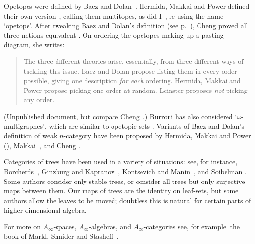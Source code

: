 \begin{notes}

Opetopes were defined by Baez and Dolan~\cite{BDHDA3}.  Hermida, Makkai and
Power defined their own version~\cite{HMP1, HMP2, HMP3, HMPHDM}, calling
them multitopes, as did I~\cite[4.1]{GOM}, re-using the name `opetope'.
After tweaking Baez and Dolan's definition (see p.~\pageref{p:BD-tweak}),
Cheng%
%
%
proved all three notions equivalent \cite{CheWOM, CheWCO}.  On
ordering%
%
%
%
%
the opetopes making up a pasting diagram, she writes:
%
\begin{quote}
  The three different theories arise, essentially, from three different
  ways of tackling this issue.  Baez and Dolan propose listing them in
  every order possible, giving one description \emph{for each} ordering.
  Hermida, Makkai and Power propose picking one order at random.  Leinster
  proposes \emph{not} picking any order.
\end{quote}
%
(Unpublished document, but compare Cheng~\cite[1.3]{CheWOM}.)  Burroni%
%
%
has
also considered `$\omega$-multigraphes', which are similar to opetopic sets
\cite{BurHDW, BurHDWA}.  Variants of Baez and Dolan's definition of weak
$n$-category have been proposed by Hermida, Makkai and Power (), Makkai~\cite{MakMOC},%
%
%
and Cheng \cite{CheWOM, CheCOCOS, CheACU}.

Categories of trees have been used in a variety of situations: see, for
instance, Borcherds~\cite{Borch},%
%
%
Ginzburg%
%
%
and Kapranov~\cite{GiKa},%
%
%
Kontsevich%
%
%
and Manin~\cite{KMGWC},%
%
%
and Soibelman%
%
%
\cite{SoiMTC, SoiMBC}.
Some authors consider only stable trees, or consider all trees but only
surjective maps between them.  Our maps of trees are the identity on
leaf-sets, but some authors allow the leaves to be moved; doubtless this is
natural for certain parts of higher-dimensional algebra.

For more on $A_\infty$-spaces, $A_\infty$-algebras, and
$A_\infty$-categories see, for example, the book of Markl, Shnider and
Stasheff~\cite{MSS}.


\end{notes}
